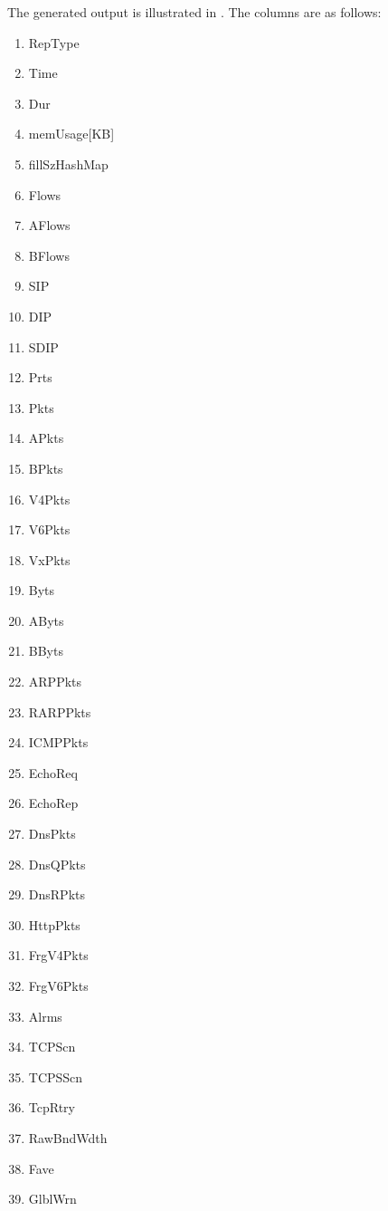 The generated output is illustrated in . The columns are as follows:
\begin{multicols}{3}
    \begin{enumerate}
        \item RepType
        \item Time
        \item Dur
        \item memUsage[KB]
        \item fillSzHashMap
        \item Flows
        \item AFlows
        \item BFlows
        \item SIP
        \item DIP
        \item SDIP
        \item Prts
        \item Pkts
        \item APkts
        \item BPkts
        \item V4Pkts
        \item V6Pkts
        \item VxPkts
        \item Byts
        \item AByts
        \item BByts
        \item ARPPkts
        \item RARPPkts
        \item ICMPPkts
        \item EchoReq
        \item EchoRep
        \item DnsPkts
        \item DnsQPkts
        \item DnsRPkts
        \item HttpPkts
        \item FrgV4Pkts
        \item FrgV6Pkts
        \item Alrms
        \item TCPScn
        \item TCPSScn
        \item TcpRtry
        \item RawBndWdth
        \item Fave
        \item GlblWrn
    \end{enumerate}
\end{multicols}

